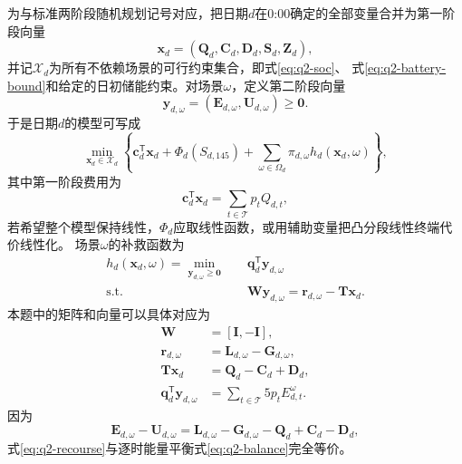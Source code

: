 \documentclass[UTF8,11pt]{ctexart}
\begin{document}
为与标准两阶段随机规划记号对应，把日期$d$在0:00确定的全部变量合并为第一阶段向量
\begin{equation}
    \bm x_d=(\bm Q_d,\bm C_d,\bm D_d,\bm S_d,\bm Z_d),
\end{equation}
并记$\mathcal X_d$为所有不依赖场景的可行约束集合，即式\eqref{eq:q2-soc}、
式\eqref{eq:q2-battery-bound}和给定的日初储能约束。对场景$\omega$，定义第二阶段向量
\begin{equation}
    \bm y_{d,\omega}=(\bm E_{d,\omega},\bm U_{d,\omega})\geq\bm0.
\end{equation}
于是日期$d$的模型可写成
\begin{equation}
    \min_{\bm x_d\in\mathcal X_d}
    \left\{
    \bm c_d^{\mathsf T}\bm x_d
    +\Phi_d(S_{d,145})
    +\sum_{\omega\in\Omega_d}\pi_{d,\omega}
      h_d(\bm x_d,\omega)
    \right\},
    \label{eq:q2-decomposed-master}
\end{equation}
其中第一阶段费用为
\begin{equation}
    \bm c_d^{\mathsf T}\bm x_d=\sum_{t\in\mathcal T}p_tQ_{d,t},
\end{equation}
若希望整个模型保持线性，$\Phi_d$应取线性函数，或用辅助变量把凸分段线性终端代价线性化。
场景$\omega$的补救函数为
\begin{equation}
\begin{aligned}
 h_d(\bm x_d,\omega)=
 \min_{\bm y_{d,\omega}\geq\bm0}\quad
 &\bm q_d^{\mathsf T}\bm y_{d,\omega}\\
 \text{s.t.}\quad
 &\bm W\bm y_{d,\omega}
 =\bm r_{d,\omega}-\bm T\bm x_d.
\end{aligned}
\label{eq:q2-recourse}
\end{equation}
本题中的矩阵和向量可以具体对应为
\begin{equation}
\begin{aligned}
 \bm W&=[\bm I,-\bm I],\\
 \bm r_{d,\omega}&=\bm L_{d,\omega}-\bm G_{d,\omega},\\
 \bm T\bm x_d&=\bm Q_d-\bm C_d+\bm D_d,\\
 \bm q_d^{\mathsf T}\bm y_{d,\omega}
 &=\sum_{t\in\mathcal T}5p_tE^{\omega}_{d,t}.
\end{aligned}
\label{eq:q2-matrix-map}
\end{equation}
因为
\begin{equation}
 \bm E_{d,\omega}-\bm U_{d,\omega}
 =\bm L_{d,\omega}-\bm G_{d,\omega}
  -\bm Q_d+\bm C_d-\bm D_d,
\end{equation}
式\eqref{eq:q2-recourse}与逐时能量平衡式\eqref{eq:q2-balance}完全等价。
\end{document}
